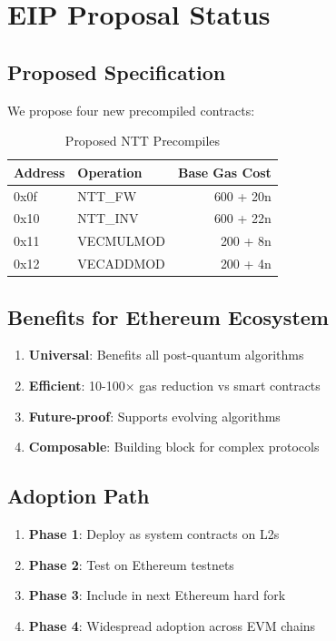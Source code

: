 \section{EIP Proposal Status}


\subsection{Proposed Specification}

We propose four new precompiled contracts:

\begin{table}[h]
\centering
\caption{Proposed NTT Precompiles}
\begin{tabular}{llr}
\toprule
Address & Operation & Base Gas Cost \\
\midrule
0x0f & NTT\_FW & 600 + 20n \\
0x10 & NTT\_INV & 600 + 22n \\
0x11 & VECMULMOD & 200 + 8n \\
0x12 & VECADDMOD & 200 + 4n \\
\bottomrule
\end{tabular}
\end{table}

\subsection{Benefits for Ethereum Ecosystem}

\begin{enumerate}
\item \textbf{Universal}: Benefits all post-quantum algorithms
\item \textbf{Efficient}: 10-100× gas reduction vs smart contracts
\item \textbf{Future-proof}: Supports evolving algorithms
\item \textbf{Composable}: Building block for complex protocols
\end{enumerate}

\subsection{Adoption Path}

\begin{enumerate}
\item \textbf{Phase 1}: Deploy as system contracts on L2s
\item \textbf{Phase 2}: Test on Ethereum testnets
\item \textbf{Phase 3}: Include in next Ethereum hard fork
\item \textbf{Phase 4}: Widespread adoption across EVM chains
\end{enumerate}


